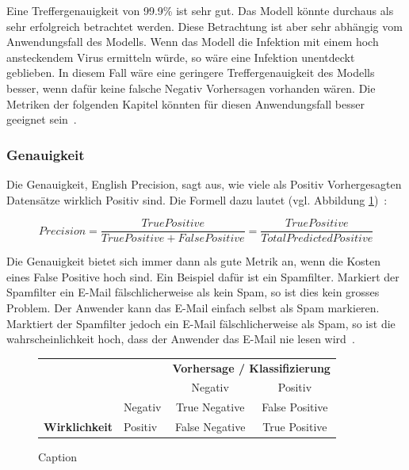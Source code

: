 Eine Treffergenauigkeit von 99.9\% ist sehr gut. Das Modell könnte durchaus als sehr erfolgreich betrachtet werden. Diese Betrachtung ist aber sehr abhängig vom Anwendungsfall des Modells. Wenn das Modell die Infektion mit einem hoch ansteckendem Virus ermitteln würde, so wäre eine Infektion unentdeckt geblieben. In diesem Fall wäre eine geringere Treffergenauigkeit des Modells besser, wenn dafür keine falsche Negativ Vorhersagen vorhanden wären. Die Metriken der folgenden Kapitel könnten für diesen Anwendungsfall besser geeignet sein~\autocite{TDAAccuracy}.

\subsubsection{Genauigkeit}

Die Genauigkeit, English Precision, sagt aus, wie viele als Positiv Vorhergesagten Datensätze wirklich Positiv sind. Die Formell dazu lautet (vgl. Abbildung \ref{cm-precision})~\autocite{TDSAccuracy}: 

$$Precision = \frac{True Positive}{True Positive + False Positive} = \frac{True Positive}{Total Predicted Positive}$$

Die Genauigkeit bietet sich immer dann als gute Metrik an, wenn die Kosten eines False Positive hoch sind. Ein Beispiel dafür ist ein Spamfilter. Markiert der Spamfilter ein E-Mail fälschlicherweise als kein Spam, so ist dies kein grosses Problem. Der Anwender kann das E-Mail einfach selbst als Spam markieren. Marktiert der Spamfilter jedoch ein E-Mail fälschlicherweise als Spam, so ist die wahrscheinlichkeit hoch, dass der Anwender das E-Mail nie lesen wird~\autocite{TDSAccuracy}.

\begin{figure}[h]
    \centering
    \def\arraystretch{1.5}
    \begin{tabular}{llcc}
        \multicolumn{2}{l}{}                                                                        & \multicolumn{2}{c}{\textbf{Vorhersage / Klassifizierung}}                                         \\ \cline{3-4} 
        \multicolumn{1}{c}{\textbf{}}                                & \multicolumn{1}{l|}{}        & \multicolumn{1}{c|}{Negativ}        & \multicolumn{1}{c|}{\cellcolor[HTML]{B5D0EE}Positiv}        \\ \cline{2-4} 
        \multicolumn{1}{l|}{}                                        & \multicolumn{1}{l|}{Negativ} & \multicolumn{1}{c|}{True Negative}  & \multicolumn{1}{c|}{\cellcolor[HTML]{B5D0EE}False Positive} \\ \cline{2-4} 
        \multicolumn{1}{l|}{\multirow{-2}{*}{\textbf{Wirklichkeit}}} & \multicolumn{1}{l|}{Positiv} & \multicolumn{1}{c|}{False Negative} & \multicolumn{1}{c|}{\cellcolor[HTML]{B5D0EE}True Positive}  \\ \cline{2-4} 
    \end{tabular}
    \caption{Caption}
    \label{cm-precision}
\end{figure}


